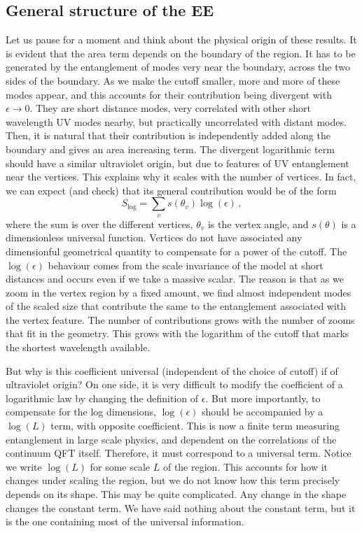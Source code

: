 \documentclass[11pt]{article}
\numberwithin{equation}{section}
\newcommand{\be}{\begin{equation}}
\newcommand{\ee}{\end{equation}}
\begin{document}
\subsection{General structure of the EE}
\label{ge}
Let us pause for a moment and think about the physical origin of these results. It is evident that the area term depends on the boundary of the region. It has to be generated by the entanglement of modes very near the boundary, across the two sides of the boundary. As we make the cutoff smaller, more and more of these modes appear, and this accounts for their contribution being divergent with $\epsilon\rightarrow 0$. They are short distance modes, very correlated with other short wavelength UV modes nearby, but practically uncorrelated with distant modes. Then, it is natural that their contribution is independently added along the boundary and gives an area increasing term. The divergent logarithmic term should have a similar ultraviolet origin, but due to features of UV entanglement near the vertices. 
This explains why it scales with the number of vertices. In fact, we can expect (and check) that its general contribution would be of the form
\be
S_{\log}=\sum_{v} s(\theta_v) \log(\epsilon)\,,
\ee
where the sum is over the different vertices, $\theta_v$ is the vertex angle, and $s(\theta)$ is a dimensionless universal function. Vertices do not have associated any dimensionful geometrical quantity to compensate for a power of the cutoff.  The $\log(\epsilon)$ behaviour comes from the scale invariance of the model at short distances and occurs even if we take a massive scalar. The reason is that as we zoom in the vertex region by a fixed amount, we find almost independent modes of the scaled size that contribute the same to the entanglement associated with the vertex feature. The number of contributions grows with the number of zooms that fit in the geometry. This grows with the logarithm of the cutoff that marks the shortest wavelength available.  

 But why is this coefficient universal (independent of the choice of cutoff) if of ultraviolet origin? On one side, it is very difficult to modify the coefficient of a logarithmic law by changing the definition of $\epsilon$. But more importantly, to compensate for the log dimensions, $\log(\epsilon)$ should be accompanied by a $\log(L)$ term,  with opposite coefficient. This is now a finite term measuring entanglement in large scale physics, and dependent on the correlations of the continuum QFT itself. Therefore, it must correspond to a universal term. Notice we write $\log(L)$ for some scale $L$ of the region. This accounts for how it changes under scaling the region,  but we do not know how this term precisely depends on its shape. This may be quite complicated. Any change in the shape changes the constant term. We have said nothing about the constant term, but it is the one containing most of the universal information.       
\end{document}

